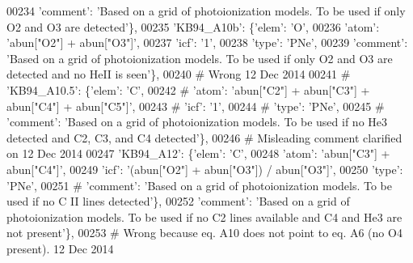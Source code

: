 \begin{DoxyCode}
00234                                       \textcolor{stringliteral}{'comment'}: \textcolor{stringliteral}{'Based on a grid of photoionization models. To be used if
       only O2 and O3 are detected'}\},
00235                          \textcolor{stringliteral}{'KB94\_A10b'}: \{\textcolor{stringliteral}{'elem'}: \textcolor{stringliteral}{'O'},
00236                                       \textcolor{stringliteral}{'atom'}: \textcolor{stringliteral}{'abun["O2"] + abun["O3"]'},
00237                                       \textcolor{stringliteral}{'icf'}: \textcolor{stringliteral}{'1'},
00238                                       \textcolor{stringliteral}{'type'}: \textcolor{stringliteral}{'PNe'},
00239                                       \textcolor{stringliteral}{'comment'}: \textcolor{stringliteral}{'Based on a grid of photoionization models. To be used if
       only O2 and O3 are detected and no HeII is seen'}\},
00240 \textcolor{comment}{# Wrong  12 Dec 2014}
00241 \textcolor{comment}{#                         'KB94\_A10.5': \{'elem': 'C',}
00242 \textcolor{comment}{#                                        'atom': 'abun["C2"] + abun["C3"] + abun["C4"] + abun["C5"]',}
00243 \textcolor{comment}{#                                        'icf': '1',}
00244 \textcolor{comment}{#                                        'type': 'PNe',}
00245 \textcolor{comment}{#                                        'comment': 'Based on a grid of photoionization models. To be used
       if no He3 detected and C2, C3, and C4 detected'\},}
00246 \textcolor{comment}{# Misleading comment clarified on 12 Dec 2014 }
00247                         \textcolor{stringliteral}{'KB94\_A12'}: \{\textcolor{stringliteral}{'elem'}: \textcolor{stringliteral}{'C'},
00248                                       \textcolor{stringliteral}{'atom'}: \textcolor{stringliteral}{'abun["C3"] + abun["C4"]'},
00249                                       \textcolor{stringliteral}{'icf'}: \textcolor{stringliteral}{'(abun["O2"] + abun["O3"]) / abun["O3"]'},
00250                                       \textcolor{stringliteral}{'type'}: \textcolor{stringliteral}{'PNe'},
00251 \textcolor{comment}{#                                      'comment': 'Based on a grid of photoionization models. To be used if
       no C II lines detected'\},}
00252                                       \textcolor{stringliteral}{'comment'}: \textcolor{stringliteral}{'Based on a grid of photoionization models. To be used if
       no C2 lines available and C4 and He3 are not present'}\},
00253 \textcolor{comment}{# Wrong because eq. A10 does not point to eq. A6 (no O4 present). 12 Dec 2014}

\end{DoxyCode}
